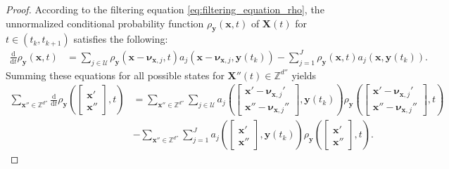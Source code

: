 \begin{proof}  
    According to the filtering equation \eqref{eq:filtering_equation_rho}, the unnormalized conditional probability function $\rho_{\boldsymbol{y}}(\boldsymbol{x}, t)$ of $\boldsymbol{X}(t)$ for $t \in (t_k, t_{k+1})$ satisfies the following:
    \begin{align*}
        \frac{\mathrm{d}}{\mathrm{d} t} \rho_{\boldsymbol{y}}(\boldsymbol{x}, t) 
        &= \sum_{j \in \mathcal{U}} \rho_{\boldsymbol{y}}(\boldsymbol{x} - \boldsymbol{\nu}_{\boldsymbol{x}, j}, t) a_j \left( \boldsymbol{x}-\boldsymbol{\nu}_{\boldsymbol{x}, j}, \boldsymbol{y}(t_k) \right) - \sum_{j=1}^{J} \rho_{\boldsymbol{y}}(\boldsymbol{x}, t) a_j \left( \boldsymbol{x}, \boldsymbol{y}(t_k) \right).
    \end{align*}
    Summing these equations for all possible states for $\boldsymbol{X}''(t) \in \mathbb{Z}^{d''}$ yields
    \begin{align*}
        \sum_{\boldsymbol{x}'' \in \mathbb{Z}^{d''}} \frac{\mathrm{d}}{\mathrm{d} t} \rho_{\boldsymbol{y}} \left( \begin{bmatrix} \boldsymbol{x}' \\ \boldsymbol{x}'' \end{bmatrix} , t \right) 
        &= \sum_{\boldsymbol{x}'' \in \mathbb{Z}^{d''}}\sum_{j \in \mathcal{U}} a_j \left( \begin{bmatrix} \boldsymbol{x}' - \boldsymbol{\nu}_{\boldsymbol{x}, j}' \\ \boldsymbol{x}'' - \boldsymbol{\nu}_{\boldsymbol{x}, j}'' \end{bmatrix}, \boldsymbol{y}(t_k) \right) \rho_{\boldsymbol{y}} \left( \begin{bmatrix} \boldsymbol{x}' - \boldsymbol{\nu}_{\boldsymbol{x}, j}' \\ \boldsymbol{x}'' - \boldsymbol{\nu}_{\boldsymbol{x}, j}''\end{bmatrix} , t \right)  \\
        &- \sum_{\boldsymbol{x}'' \in \mathbb{Z}^{d''}} \sum_{j=1}^{J} a_j \left( \begin{bmatrix} \boldsymbol{x}' \\ \boldsymbol{x}'' \end{bmatrix}, \boldsymbol{y}(t_k) \right) \rho_{\boldsymbol{y}} \left( \begin{bmatrix} \boldsymbol{x}' \\ \boldsymbol{x}'' \end{bmatrix}, t \right) .
    \end{align*}

\end{proof}
